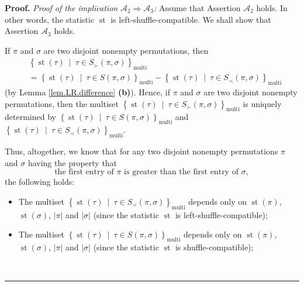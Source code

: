 \documentclass[numbers=enddot,12pt,final,onecolumn,notitlepage]{scrartcl}%
\theoremstyle{definition}
\newenvironment{proof}[1][Proof]{\noindent\textbf{#1.} }{\ \rule{0.5em}{0.5em}}
\begin{document}
\begin{proof}
\textit{Proof of the implication }$\mathcal{A}_{2}\Longrightarrow
\mathcal{A}_{3}$\textit{:} Assume that Assertion $\mathcal{A}_{2}$ holds. In
other words, the statistic $\operatorname*{st}$ is left-shuffle-compatible. We
shall show that Assertion $\mathcal{A}_{3}$ holds.

If $\pi$ and $\sigma$ are two disjoint nonempty permutations, then%
\begin{align*}
&  \left\{  \operatorname*{st}\left(  \tau\right)  \ \mid\ \tau\in S_{\succ
}\left(  \pi,\sigma\right)  \right\}  _{\operatorname*{multi}}\\
&  =\left\{  \operatorname*{st}\left(  \tau\right)  \ \mid\ \tau\in S\left(
\pi,\sigma\right)  \right\}  _{\operatorname*{multi}}-\left\{
\operatorname*{st}\left(  \tau\right)  \ \mid\ \tau\in S_{\prec}\left(
\pi,\sigma\right)  \right\}  _{\operatorname*{multi}}%
\end{align*}
(by Lemma \ref{lem.LR.difference} \textbf{(b)}). Hence, if $\pi$ and $\sigma$
are two disjoint nonempty permutations, then the multiset $\left\{
\operatorname*{st}\left(  \tau\right)  \ \mid\ \tau\in S_{\succ}\left(
\pi,\sigma\right)  \right\}  _{\operatorname*{multi}}$ is uniquely determined
by $\left\{  \operatorname*{st}\left(  \tau\right)  \ \mid\ \tau\in S\left(
\pi,\sigma\right)  \right\}  _{\operatorname*{multi}}$ and $\left\{
\operatorname*{st}\left(  \tau\right)  \ \mid\ \tau\in S_{\prec}\left(
\pi,\sigma\right)  \right\}  _{\operatorname*{multi}}$.

Thus, altogether, we know that for any two disjoint nonempty permutations
$\pi$ and $\sigma$ having the property that%
\[
\text{the first entry of }\pi\text{ is greater than the first entry of }%
\sigma,
\]
the following holds:

\begin{itemize}
\item The multiset $\left\{  \operatorname*{st}\left(  \tau\right)
\ \mid\ \tau\in S_{\prec}\left(  \pi,\sigma\right)  \right\}
_{\operatorname*{multi}}$ depends only on $\operatorname*{st}\left(
\pi\right)  $, $\operatorname*{st}\left(  \sigma\right)  $, $\left\vert
\pi\right\vert $ and $\left\vert \sigma\right\vert $ (since the statistic
$\operatorname*{st}$ is left-shuffle-compatible);

\item The multiset $\left\{  \operatorname*{st}\left(  \tau\right)
\ \mid\ \tau\in S\left(  \pi,\sigma\right)  \right\}  _{\operatorname*{multi}%
}$ depends only on $\operatorname*{st}\left(  \pi\right)  $,
$\operatorname*{st}\left(  \sigma\right)  $, $\left\vert \pi\right\vert $ and
$\left\vert \sigma\right\vert $ (since the statistic $\operatorname*{st}$ is shuffle-compatible);


\end{itemize}
\end{proof}
\end{document}
